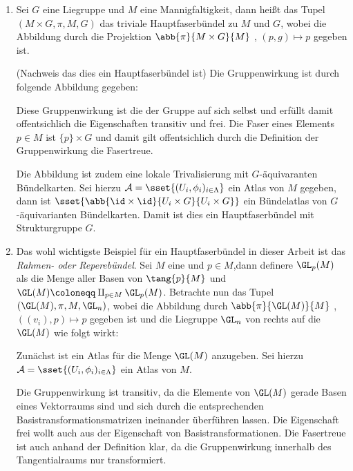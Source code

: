 \begin{Bsp}
	\begin{enumerate}[1)]
		\item Sei $G$ eine Liegruppe und $M$ eine Mannigfaltigkeit, dann heißt das Tupel $(M \times G, \pi, M, G)$ das triviale Hauptfaserbündel zu $M$ und $G$, wobei die Abbildung
		durch die Projektion $\abb{\pi}{M \times G}{M}$ , $(p,g) \mapsto p$ 
		gegeben ist. 
		\begin{smallproof}(Nachweis das dies ein Hauptfaserbündel ist)
		Die Gruppenwirkung ist durch folgende Abbildung gegeben:
		
		Diese Gruppenwirkung ist die der Gruppe auf sich selbst
		und erfüllt damit offentsichlich die Eigenschaften
		transitiv und frei. Die Faser eines Elements $p\in M$ 
		ist $\{p\}\times G$ und damit gilt offentsichlich
		durch die Definition der Gruppenwirkung die Fasertreue.
		
		Die Abbildung ist zudem eine lokale Trivalisierung mit
		$G$-äquivaranten Bündelkarten. Sei hierzu $\mathcal{A}=\sset{(U_i,\phi_i)_{i \in \Lambda}}$ ein
		Atlas von $M$ gegeben, dann ist $ \sset{\abb{\id\times\id}{U_i \times G}{U_i\times G}} $ ein Bündelatlas	von $G$-äquivarianten Bündelkarten.
		Damit ist dies ein Hauptfaserbündel mit Strukturgruppe $G$.
		\end{smallproof}
		
		\item Das wohl wichtigste Beispiel für ein Hauptfaserbündel in dieser
		Arbeit ist das \textit{Rahmen- oder Reperebündel}. Sei $M$ eine \mfg und $p \in M$,dann definere $\GL_p(M)$ als die Menge aller Basen von
		$\tang{p}{M}$ und $\GL(M) \coloneqq \amalg_{p \in M} \GL_p(M)$. 
		Betrachte nun das Tupel $(\GL(M),\pi,M,\GL_n)$, wobei die Abbildung
		durch $\abb{\pi}{\GL(M)}{M}$ , $((v_i),p) \mapsto p$ gegeben ist
		und die Liegruppe $\GL_n$ von rechts auf die \mfg $\GL(M)$ wie  folgt
		wirkt:
		\begin{center}
		\end{center}
		\begin{smallproof}
			Zunächst ist ein Atlas für die Menge $ \GL(M) $ anzugeben. Sei hierzu $\mathcal{A}=\sset{(U_i,\phi_i)_{i\in \Lambda}}$
			ein Atlas von $M$. 
			
			Die Gruppenwirkung ist transitiv, da die Elemente
			von $\GL(M)$ gerade Basen eines Vektorraums sind
			und sich durch die entsprechenden Basistransformationsmatrizen ineinander überführen
			lassen. Die Eigenschaft frei wollt auch aus
			der Eigenschaft von Basistransformationen. Die
			Fasertreue ist auch anhand der Definition klar, 
			da die Gruppenwirkung innerhalb des Tangentialraums
			nur transformiert.
			
			
		\end{smallproof}
		
	\end{enumerate}
\end{Bsp}


